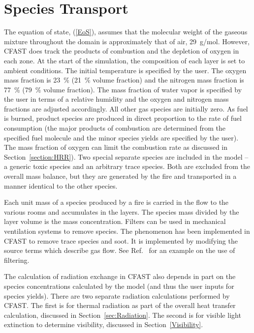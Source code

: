 \documentclass[12pt]{book}
\begin{document}
\section{Species Transport}

The equation of state, (\ref{EoS}), assumes that the molecular weight of the gaseous mixture throughout the domain is approximately that of air, 29~g/mol. However, CFAST does track the products of combustion and the depletion of oxygen in each zone. At the start of the simulation, the composition of each layer is set to ambient conditions. The initial temperature is specified by the user. The oxygen mass fraction is 23~\% (21~\% volume fraction) and the nitrogen mass fraction is 77~\% (79~\% volume fraction). The mass fraction of water vapor is specified by the user in terms of a relative humidity and the oxygen and nitrogen mass fractions are adjusted accordingly. All other gas species are initially zero.  As fuel is burned, product species are produced in direct proportion to the rate of fuel consumption (the major products of combustion are determined from the specified fuel molecule and the minor species yields are specified by the user). The mass fraction of oxygen can limit the combustion rate as discussed in Section~\ref{section:HRR}). Two special separate species are included in the model -- a generic toxic species and an arbitrary trace species. Both are excluded from the overall mass balance, but they are generated by the fire and transported in a manner identical to the other species.

Each unit mass of a species produced by a fire is carried in the flow to the various rooms and accumulates in the layers. The species mass divided by the layer volume is the mass concentration. Filters can be used in mechanical ventilation systems to remove species. The phenomenon has been implemented in CFAST to remove trace species and soot. It is implemented by modifying the source terms which describe gas flow. See Ref.~\cite{Jones:2008} for an example on the use of filtering.

The calculation of radiation exchange in CFAST also depends in part on the species concentrations calculated by the model (and thus the user inputs for species yields). There are two separate radiation calculations performed by CFAST. The first is for thermal radiation as part of the overall heat transfer calculation, discussed in Section~\ref{sec:Radiation}. The second is for visible light extinction to determine visibility, discussed in Section~\ref{Visibility}.
\end{document}
